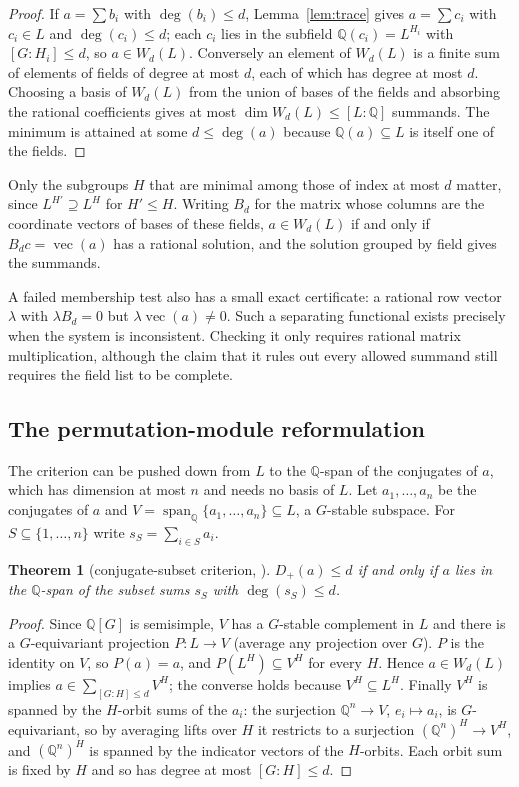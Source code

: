 \documentclass[11pt,a4paper]{article}
\newtheorem{theorem}{Theorem}[section]
\theoremstyle{definition}
\theoremstyle{remark}
\newcommand{\Q}{\mathbb{Q}}
\newcommand{\dg}{\deg}
\newcommand{\Dp}{D_{+}}
\begin{document}
\begin{proof}
If $a=\sum b_i$ with $\dg(b_i)\le d$, Lemma~\ref{lem:trace} gives $a=\sum c_i$ with $c_i\in L$ and
$\dg(c_i)\le d$; each $c_i$ lies in the subfield $\Q(c_i)=L^{H_i}$ with $[G:H_i]\le d$, so
$a\in W_d(L)$.  Conversely an element of $W_d(L)$ is a finite sum of elements of fields of degree at
most $d$, each of which has degree at most $d$.  Choosing a basis of $W_d(L)$ from the union of bases of
the fields and absorbing the rational coefficients gives at most $\dim W_d(L)\le[L:\Q]$ summands.
The minimum is attained at some $d\le\dg(a)$ because $\Q(a)\subseteq L$ is itself one of the fields.
\end{proof}

Only the subgroups $H$ that are minimal among those of index at most $d$ matter, since $L^{H'}\supseteq
L^H$ for $H'\le H$.  Writing $B_d$ for the matrix whose columns are the coordinate vectors of bases of
these fields, $a\in W_d(L)$ if and only if $B_dc=\operatorname{vec}(a)$ has a rational solution, and the
solution grouped by field gives the summands.

A failed membership test also has a small exact certificate: a rational row vector $\lambda$ with
$\lambda B_d=0$ but $\lambda\operatorname{vec}(a)\ne0$.  Such a separating functional exists precisely
when the system is inconsistent.  Checking it only requires rational matrix multiplication, although
the claim that it rules out every allowed summand still requires the field list to be complete.

\subsection{The permutation-module reformulation}

The criterion can be pushed down from $L$ to the $\Q$-span of the conjugates of $a$, which has dimension
at most $n$ and needs no basis of $L$.  Let $a_1,\dots,a_n$ be the conjugates of $a$ and
$V=\operatorname{span}_\Q\{a_1,\dots,a_n\}\subseteq L$, a $G$-stable subspace.  For $S\subseteq
\{1,\dots,n\}$ write $s_S=\sum_{i\in S}a_i$.

\begin{theorem}[conjugate-subset criterion, \cite{r1}]\label{thm:subsets}
$\Dp(a)\le d$ if and only if $a$ lies in the $\Q$-span of the subset sums $s_S$ with $\dg(s_S)\le d$.
\end{theorem}

\begin{proof}
Since $\Q[G]$ is semisimple, $V$ has a $G$-stable complement in $L$ and there is a $G$-equivariant
projection $P:L\to V$ (average any projection over $G$).  $P$ is the identity on $V$, so $P(a)=a$, and
$P(L^H)\subseteq V^H$ for every $H$.  Hence $a\in W_d(L)$ implies $a\in\sum_{[G:H]\le d}V^H$; the
converse holds because $V^H\subseteq L^H$.  Finally $V^H$ is spanned by the $H$-orbit sums of the $a_i$:
the surjection $\Q^n\to V$, $e_i\mapsto a_i$, is $G$-equivariant, so by averaging lifts over $H$ it
restricts to a surjection $(\Q^n)^H\to V^H$, and $(\Q^n)^H$ is spanned by the indicator vectors of the
$H$-orbits.  Each orbit sum is fixed by $H$ and so has degree at most $[G:H]\le d$.
\end{proof}
\end{document}
